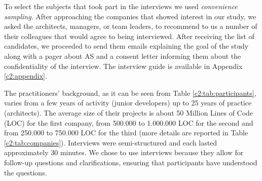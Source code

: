 To select the subjects that took part in the interviews we used \emph{convenience sampling}. After approaching the companies that showed interest in our study, we asked the architects, managers, or team leaders, to recommend to us a number of their colleagues that would agree to being interviewed. After receiving the list of candidates, we proceeded to send them emails explaining the goal of the study along with a pager about AS and a consent letter informing them about the confidentiality of the interview.
The interview guide is available in Appendix \ref{c2:appendix}.

The practitioners' background, as it can be seen from Table \ref{c2:tab:participants}, varies from a few years of activity (junior developers) up to 25 years of practice (architects).
The average size of their projects is about 50 Million Lines of Code (LOC) for the first company, from 500.000 to 1.000.000 LOC for the second and from 250.000 to 750.000 LOC for the third (more details are reported in Table \ref{c2:tab:companies}). 
Interviews were semi-structured and each lasted approximately 30 minutes. We chose to use interviews because they allow for follow-up questions and clarifications, ensuring that participants have understood the questions. 

